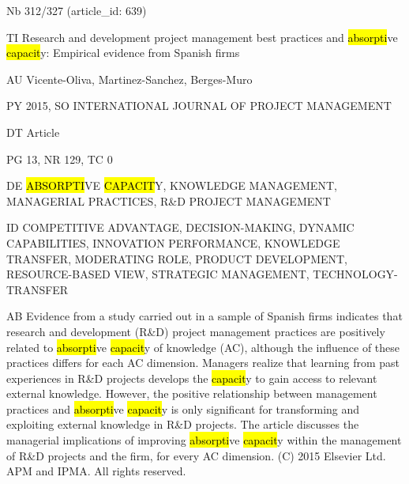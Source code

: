 \documentclass[a4paper]{article}
\begin{document}
\vspace*{-2cm}
Nb \tabto{0cm}312/327 (article\_id: 639)\par
TI \tabto{0cm}Research and development project management best practices and \hl{absorpti}ve \hl{capacit}y: Empirical evidence from Spanish firms\par
AU \tabto{0cm}Vicente-Oliva, Martinez-Sanchez, Berges-Muro\par
PY \tabto{0cm}2015, SO INTERNATIONAL JOURNAL OF PROJECT MANAGEMENT\par
DT \tabto{0cm}Article\par
PG \tabto{0cm}13, NR 129, TC 0\par
DE \tabto{0cm}\hl{ABSORPTI}VE \hl{CAPACIT}Y, KNOWLEDGE MANAGEMENT, MANAGERIAL PRACTICES, R\&D PROJECT MANAGEMENT\par
ID \tabto{0cm}COMPETITIVE ADVANTAGE, DECISION-MAKING, DYNAMIC CAPABILITIES, INNOVATION PERFORMANCE, KNOWLEDGE TRANSFER, MODERATING ROLE, PRODUCT DEVELOPMENT, RESOURCE-BASED VIEW, STRATEGIC MANAGEMENT, TECHNOLOGY-TRANSFER\par
AB \tabto{0cm}Evidence from a study carried out in a sample of Spanish firms indicates that research and development (R\&D) project management practices are positively related to \hl{absorpti}ve \hl{capacit}y of knowledge (AC), although the influence of these practices differs for each AC dimension. Managers realize that learning from past experiences in R\&D projects develops the \hl{capacit}y to gain access to relevant external knowledge. However, the positive relationship between management practices and \hl{absorpti}ve \hl{capacit}y is only significant for transforming and exploiting external knowledge in R\&D projects. The article discusses the managerial implications of improving \hl{absorpti}ve \hl{capacit}y within the management of R\&D projects and the firm, for every AC dimension. (C) 2015 Elsevier Ltd. APM and IPMA. All rights reserved.\par
\clearpage
\end{document}
